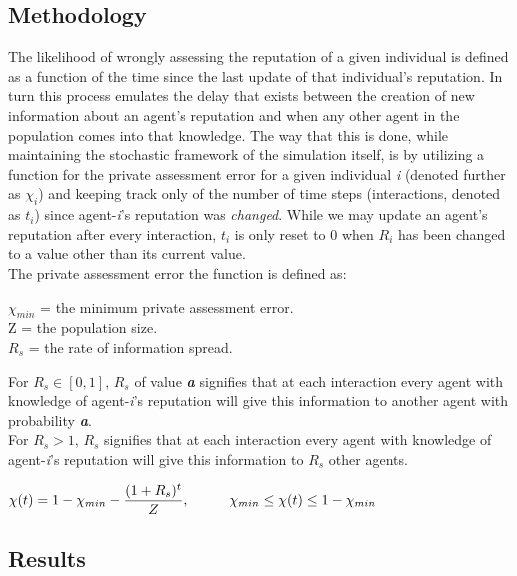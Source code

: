 \documentclass[10pt,a4paper]{article}
\newcommand\tab[1][1cm]{\hspace*{#1}}
\begin{document}
\subsection{Methodology}
The likelihood of wrongly assessing the reputation of a given individual is defined as a function of the time since the last update of that individual's reputation.
In turn this process emulates the delay that exists between the creation of new information about an agent's reputation and when any other agent in the population comes into that knowledge.
The way that this is done, while maintaining the stochastic framework of the simulation itself, is by utilizing a function for the private assessment error for a given individual \textit{i} (denoted further as $\chi_{i}$) and keeping track only of the number of time steps (interactions, denoted as $\textit{t}_{i}$) since agent-\textit{i}'s reputation was \emph{changed}.
While we may update an agent's reputation after every interaction, $\textit{t}_{i}$ is only reset to 0 when $R_{i}$ has been changed to a value other than its current value.
\\
The private assessment error the function is defined as: \\
\begin{addmargin}[1em]{2em}
$\chi_{min}$ = the minimum private assessment error. \\
Z = the population size. \\
$R_{s}$ = the rate of information spread. 
\begin{addmargin}[2em]{1em}
For $R_{s} \in [0, 1]$, $R_{s}$ of value \textbf{\textit{a}} signifies that at each interaction every agent with knowledge of agent-\textit{i}'s reputation will give this information to another agent with probability \textbf{\textit{a}}. \\
For $R_{s} > 1$,  $R_{s}$ signifies that at each interaction every agent with knowledge of agent-\textit{i}'s reputation will give this information to $R_{s}$ other agents.
\end{addmargin}
\end{addmargin}
\begin{center}
$ \chi(t) = 1 - \chi_{min} - \dfrac{(1 + R_{s})^{t}}{Z},\tab \chi_{min} \leq \chi(t) \leq  1 - \chi_{min}$ \\
\end{center}

\subsection{Results}
\end{document}
